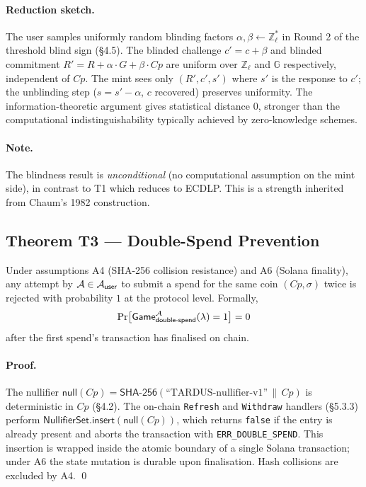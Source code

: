 \paragraph{Reduction sketch.} The user samples uniformly random blinding
factors $\alpha, \beta \gets \mathbb{Z}_\ell^\ast$ in Round 2 of the
threshold blind sign (\S4.5). The blinded challenge
$c' = c + \beta$ and blinded commitment $R' = R + \alpha \cdot G + \beta
\cdot Cp$ are uniform over $\mathbb{Z}_\ell$ and $\mathbb{G}$
respectively, independent of $Cp$. The mint sees only $(R', c', s')$
where $s'$ is the response to $c'$; the unblinding step
($s = s' - \alpha$, $c$ recovered) preserves uniformity. The
information-theoretic argument gives statistical distance $0$, stronger
than the computational indistinguishability typically achieved by
zero-knowledge schemes.

\paragraph{Note.} The blindness result is \emph{unconditional} (no
computational assumption on the mint side), in contrast to T1 which
reduces to ECDLP. This is a strength inherited from Chaum's 1982
construction.

\subsection{Theorem T3 --- Double-Spend Prevention}
\label{sec:thm-double-spend}

\begin{theorem}
\label{thm:double-spend}
Under assumptions A4 (SHA-256 collision resistance) and A6 (Solana
finality), any attempt by $\mathcal{A} \in \mathcal{A}_{\mathsf{user}}$ to submit a
spend for the same coin $(Cp, \sigma)$ twice is rejected with probability
$1$ at the protocol level. Formally,
\[
  \Pr\bigl[\mathsf{Game}_{\mathsf{double\text{-}spend}}^{\mathcal{A}}(\lambda) = 1\bigr] = 0
\]
after the first spend's transaction has finalised on chain.
\end{theorem}

\paragraph{Proof.} The nullifier
$\mathsf{null}(Cp) = \mathsf{SHA\text{-}256}(\text{``TARDUS-nullifier-v1''} \,\|\, Cp)$
is deterministic in $Cp$ (\S4.2). The on-chain
\texttt{Refresh} and \texttt{Withdraw} handlers (\S5.3.3)
perform $\mathsf{NullifierSet.insert}(\mathsf{null}(Cp))$, which returns
\texttt{false} if the entry is already present and aborts the
transaction with \texttt{ERR\_DOUBLE\_SPEND}. This insertion is wrapped
inside the atomic boundary of a single Solana transaction; under A6 the
state mutation is durable upon finalisation. Hash collisions are excluded
by A4. \qed

